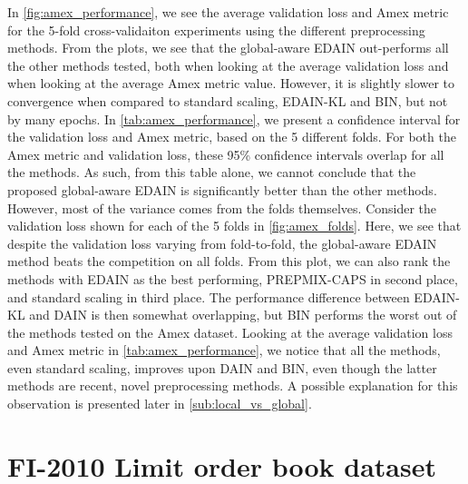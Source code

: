 \documentclass{statsmsc}
\begin{document}
{In \cref{fig:amex_performance}, we see the average validation loss and Amex metric for the
5-fold cross-validaiton experiments using the different preprocessing methods. From the plots,
we see that the global-aware \ac{EDAIN} out-performs all the other methods tested, both
when looking at the average validation loss and when looking at the average Amex metric value.
However, it is slightly slower to convergence when compared to standard scaling,
\ac{EDAIN-KL} and \ac{BIN}, but not by many epochs.
In \cref{tab:amex_performance}, we present a confidence interval for the validation loss and Amex
metric, based on the 5 different folds. For both
the Amex metric and validation loss,
these 95\% confidence intervals overlap for all the methods. As such, from this table
alone, we cannot conclude that the proposed global-aware \ac{EDAIN} is significantly better than
the other methods. However, most of the variance comes from the folds themselves. Consider the
validation loss shown for each of the 5 folds in \cref{fig:amex_folds}. Here, we see that despite
the validation loss varying from fold-to-fold, the global-aware \ac{EDAIN} method beats the
competition on all folds. From this plot, we can also rank the methods with \ac{EDAIN} as the
best performing, \ac{PREPMIX-CAPS} in second place, and standard scaling in third place.
The performance difference between \ac{EDAIN-KL} and \ac{DAIN} is then somewhat overlapping,
but \ac{BIN} performs the worst out of the methods tested on the Amex dataset.
Looking at the average validation loss and Amex metric in \cref{tab:amex_performance}, we notice
that all the methods, even standard scaling, improves upon \ac{DAIN} and \ac{BIN}, even though
the latter methods are recent, novel preprocessing methods. A possible explanation for this
observation is presented later in \cref{sub:local_vs_global}.



\section{FI-2010 Limit order book dataset}%
\label{sec:lob_data}%


}
\end{document}
